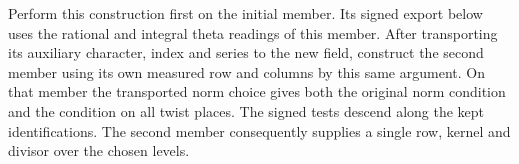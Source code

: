 Perform this construction first on the initial member. Its
signed export below uses the rational and integral theta
readings of this member. After transporting its auxiliary
character, index and series to the new field, construct the
second member using its own measured row and columns by this
same argument. On that member the transported norm choice
gives both the original norm condition and the condition on
all twist places. The signed tests descend along the kept
identifications. The second member consequently supplies a
single row, kernel and divisor over the chosen levels.
\label{cor:level-four-core-14}
